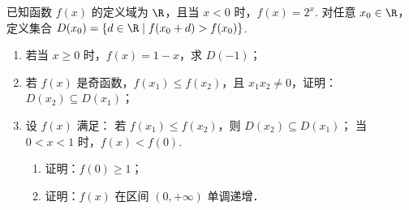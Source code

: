 \begin{problem}
已知函数 \(f(x)\) 的定义域为 \(\R\)，且当 \(x<0\) 时，\(f(x)=2^x\). 对任意 \(x_0\in\R\)，定义集合 \(D(x_0)=\{d\in\R \mid f(x_0+d)>f(x_0)\}\).

\begin{enumerate}
\item 若当 \(x\ge 0\) 时，\(f(x)=1-x\)，求 \(D(-1)\)；
\item 若 \(f(x)\) 是奇函数，\(f(x_1)\le f(x_2)\)，且 \(x_1x_2\ne 0\)，证明：\(D(x_2)\subseteq D(x_1)\)；
\item 设 \(f(x)\) 满足： 若 \(f(x_1)\le f(x_2)\)，则 \(D(x_2)\subseteq D(x_1)\)； 当 \(0<x<1\) 时，\(f(x)<f(0)\).
\begin{enumerate}
\item 证明：\(f(0)\ge 1\)；
\item 证明：\(f(x)\) 在区间 \((0,+\infty)\) 单调递增．
\end{enumerate}
\end{enumerate}
\end{problem}

